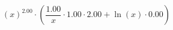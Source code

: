 \documentclass[a4paper]{article}
\begin{document}
\newpage

\[ \left( x \right)^{2.00 }  \cdot  \left( \dfrac{ 1.00 }{ x }  \cdot 1.00 \cdot 2.00 + \ln{ \left(x\right) } \cdot 0.00 \right) \] 
\end{document}
